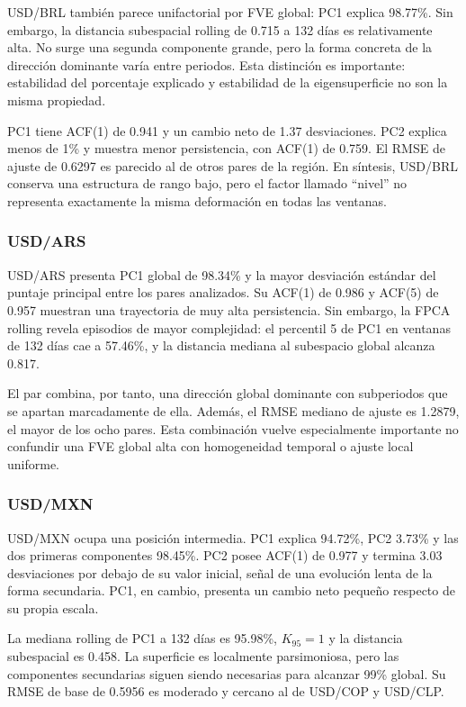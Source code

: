 \documentclass[a4paper,11pt]{article}
\begin{document}
USD/BRL también parece unifactorial por FVE global: PC1 explica 98.77\%. Sin embargo, la distancia subespacial rolling de 0.715 a 132 días es relativamente alta. No surge una segunda componente grande, pero la forma concreta de la dirección dominante varía entre periodos. Esta distinción es importante: estabilidad del porcentaje explicado y estabilidad de la eigensuperficie no son la misma propiedad.

PC1 tiene ACF(1) de 0.941 y un cambio neto de 1.37 desviaciones. PC2 explica menos de 1\% y muestra menor persistencia, con ACF(1) de 0.759. El RMSE de ajuste de 0.6297 es parecido al de otros pares de la región. En síntesis, USD/BRL conserva una estructura de rango bajo, pero el factor llamado ``nivel'' no representa exactamente la misma deformación en todas las ventanas.

\subsubsection{USD/ARS}

USD/ARS presenta PC1 global de 98.34\% y la mayor desviación estándar del puntaje principal entre los pares analizados. Su ACF(1) de 0.986 y ACF(5) de 0.957 muestran una trayectoria de muy alta persistencia. Sin embargo, la FPCA rolling revela episodios de mayor complejidad: el percentil 5 de PC1 en ventanas de 132 días cae a 57.46\%, y la distancia mediana al subespacio global alcanza 0.817.

El par combina, por tanto, una dirección global dominante con subperiodos que se apartan marcadamente de ella. Además, el RMSE mediano de ajuste es 1.2879, el mayor de los ocho pares. Esta combinación vuelve especialmente importante no confundir una FVE global alta con homogeneidad temporal o ajuste local uniforme.

\subsubsection{USD/MXN}

USD/MXN ocupa una posición intermedia. PC1 explica 94.72\%, PC2 3.73\% y las dos primeras componentes 98.45\%. PC2 posee ACF(1) de 0.977 y termina 3.03 desviaciones por debajo de su valor inicial, señal de una evolución lenta de la forma secundaria. PC1, en cambio, presenta un cambio neto pequeño respecto de su propia escala.

La mediana rolling de PC1 a 132 días es 95.98\%, \(K_{95}=1\) y la distancia subespacial es 0.458. La superficie es localmente parsimoniosa, pero las componentes secundarias siguen siendo necesarias para alcanzar 99\% global. Su RMSE de base de 0.5956 es moderado y cercano al de USD/COP y USD/CLP.
\end{document}
